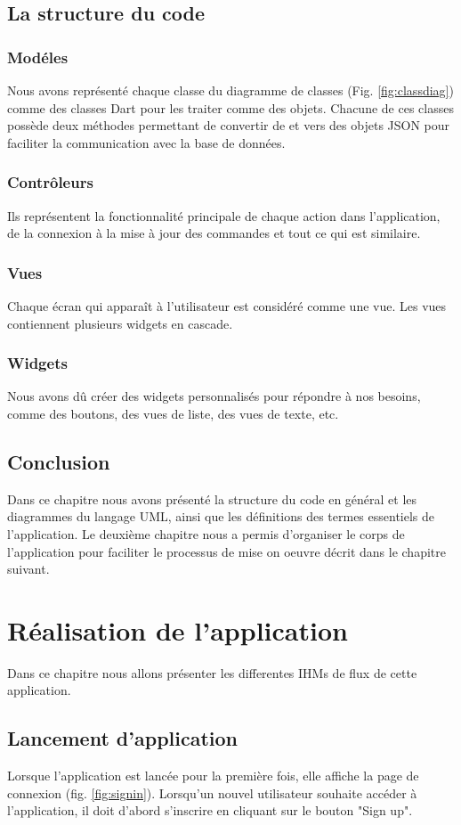 \documentclass[french, a4paper, 12pt]{report}
\begin{document}
	
	\newpage		
	\section{La structure du code}
		\subsection{Modéles} Nous avons représenté chaque classe du diagramme de classes (Fig. \ref{fig:classdiag}) comme des classes Dart pour les traiter comme des objets. Chacune de ces classes possède deux méthodes permettant de convertir de et vers des objets JSON  pour faciliter la communication avec la base de données.
		\subsection{Contrôleurs} Ils représentent la fonctionnalité principale de chaque action dans l'application, de la connexion à la mise à jour des commandes et tout ce qui est similaire.
		\subsection{Vues} Chaque écran qui apparaît à l'utilisateur est considéré comme une vue. Les vues contiennent plusieurs widgets en cascade.
		\subsection{Widgets} Nous avons dû créer des widgets personnalisés pour répondre à nos besoins, comme des boutons, des vues de liste, des vues de texte, etc.
		
	 \section*{Conclusion}
	 Dans ce chapitre nous avons présenté la structure du code en général et les diagrammes du langage UML, ainsi que les définitions des termes essentiels de l'application. Le deuxième chapitre nous a permis d'organiser le corps de l'application pour faciliter le processus de mise on oeuvre décrit dans le chapitre suivant. 
\newpage
\chapter{Réalisation de l'application} Dans ce chapitre nous allons présenter les differentes IHMs de flux de cette application.
	\section{Lancement d'application} Lorsque l'application est lancée pour la première fois, elle affiche la page de connexion (fig. \ref{fig:signin}).
Lorsqu'un nouvel utilisateur souhaite accéder à l'application, il doit d'abord s'inscrire en cliquant sur le bouton "Sign up".
\end{document}

